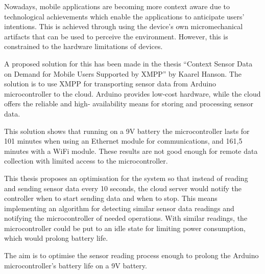 


\begin{abstracts}        %

Nowadays, mobile applications are becoming more context aware due to technological
achievements which enable the applications to anticipate users’ intentions. This is
achieved through using the device’s own micromechanical artifacts that can be used to
perceive the environment. However, this is constrained to the hardware limitations of
devices.

A proposed solution for this has been made in the thesis “Context Sensor Data on
Demand for Mobile Users Supported by XMPP” by Kaarel Hanson. The solution is
to use XMPP for transporting sensor data from Arduino microcontroller to the cloud.
Arduino provides low-cost hardware, while the cloud offers the reliable and high-
availability means for storing and processing sensor data.

This solution shows that running on a 9V battery the microcontroller lasts for 101
minutes when using an Ethernet module for communications, and 161,5 minutes with a
WiFi module. These results are not good enough for remote data collection with limited
access to the microcontroller.

This thesis proposes an optimisation for the system so that instead of reading and
sending sensor data every 10 seconds, the cloud server would notify the controller
when to start sending data and when to stop. This means implementing an algorithm
for detecting similar sensor data readings and notifying the microcontroller of needed
operations. With similar readings, the microcontroller could be put to an idle state for
limiting power consumption, which would prolong battery life.

The aim is to optimise the sensor reading process enough to prolong the Arduino
microcontroller’s battery life on a 9V battery.

\end{abstracts}


